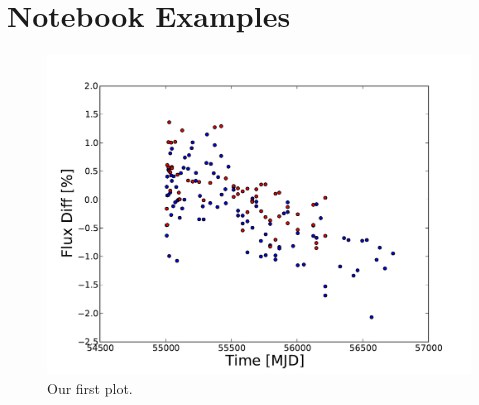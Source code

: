 \section{Notebook Examples}


\begin{figure}[tbp]
  \centering
    \includegraphics[scale=0.55]{flux_vs_time_1.pdf}
    \caption{Our first plot.}
  \label{fig:splot}
\end{figure}



